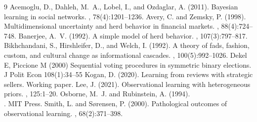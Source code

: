 \documentclass[12pt]{article}
\begin{document}

\begin{thebibliography}{9}
Acemoglu, D., Dahleh, M.~A., Lobel, I., and Ozdaglar, A. (2011).
\newblock Bayesian learning in social networks.
, 78(4):1201--1236.
Avery, C. and Zemsky, P. (1998).
\newblock Multidimensional uncertainty and herd behavior in financial markets.
, 88(4):724--748.
Banerjee, A.~V. (1992).
\newblock A simple model of herd behavior.
, 107(3):797--817.
Bikhchandani, S., Hirshleifer, D., and Welch, I. (1992).
\newblock A theory of fads, fashion, custom, and cultural change as informational cascades.
, 100(5):992--1026.
Dekel E, Piccione M (2000) Sequential voting procedures in symmetric binary elections.\\
J Polit Econ 108(1):34--55
Kogan, D. (2020).
\newblock Learning from reviews with strategic sellers.
\newblock Working paper.
Lee, J. (2021).
\newblock Observational learning with heterogeneous priors.
, 125:1--20.
Osborne, M.~J. and Rubinstein, A. (1994).\\
. MIT Press.
Smith, L. and S{\o}rensen, P. (2000).
\newblock Pathological outcomes of observational learning.
, 68(2):371--398.
\end{thebibliography}
\end{document}
